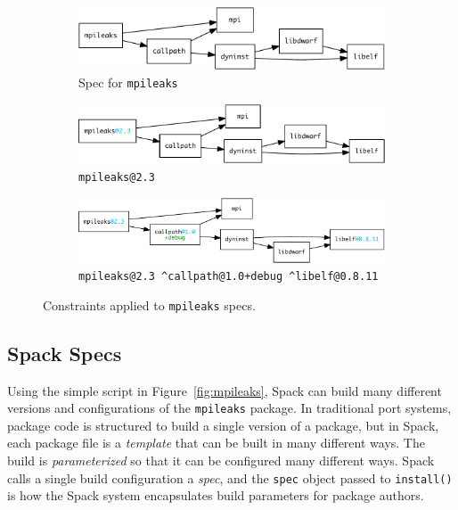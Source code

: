 
\begin{figure}
	\begin{subfigure}{\linewidth}
		\centering
		\includegraphics[width=\columnwidth]{specs/mpileaks.pdf}
		\caption{
			Spec for {\tt mpileaks}
			\label{fig:specs-mpileaks}
		}
	\end{subfigure}
%
	\begin{subfigure}{\linewidth}
		\centering
		\includegraphics[width=\columnwidth]{specs/mpileaks-version}
		\caption{
			{\tt mpileaks@2.3}
			\label{fig:specs-mpileaks-version}
		}
	\end{subfigure}
%
	\begin{subfigure}{\linewidth}
		\centering
		\includegraphics[width=\columnwidth]{specs/mpileaks-abstract.pdf}
		\caption{
			{\tt mpileaks@2.3 \^{}callpath@1.0+debug \^{}libelf@0.8.11}
			\label{fig:specs-mpileaks-abstract}
		}
	\end{subfigure}
%
	\caption{
		Constraints applied to {\tt mpileaks} specs.
	}
\end{figure}



\subsection{Spack Specs}\label{sec:specs}

Using the simple script in Figure~\ref{fig:mpileaks}, Spack can build many different
versions and configurations of the {\tt mpileaks} package.  In traditional port systems, 
package code is structured to build a single version of a package, but in Spack, each
package file is a {\it template} that can be built in many different ways.  The build is
{\it parameterized} so that it can be configured many different ways.  
Spack calls a single build configuration a {\it spec},
 and the {\tt spec} object passed to {\tt install()} 
is how the Spack system encapsulates build parameters for package authors.

